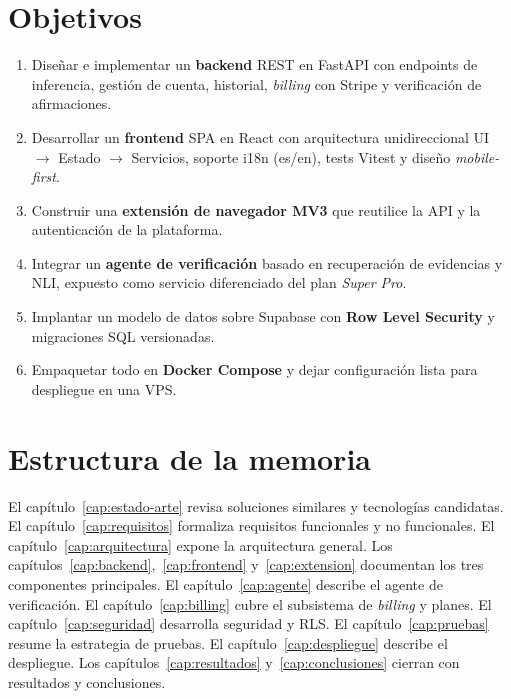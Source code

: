 \section{Objetivos}

\begin{enumerate}[leftmargin=*,itemsep=0.2em]
  \item Diseñar e implementar un \textbf{backend} REST en FastAPI con
        endpoints de inferencia, gestión de cuenta, historial,
        \emph{billing} con Stripe y verificación de afirmaciones.
  \item Desarrollar un \textbf{frontend} SPA en React con
        arquitectura unidireccional UI $\to$ Estado $\to$ Servicios,
        soporte i18n (es/en), tests Vitest y diseño \emph{mobile-first}.
  \item Construir una \textbf{extensión de navegador MV3} que reutilice
        la API y la autenticación de la plataforma.
  \item Integrar un \textbf{agente de verificación} basado en
        recuperación de evidencias y NLI, expuesto como servicio
        diferenciado del plan \emph{Super Pro}.
  \item Implantar un modelo de datos sobre Supabase con \textbf{Row
        Level Security} y migraciones SQL versionadas.
  \item Empaquetar todo en \textbf{Docker Compose} y dejar
        configuración lista para despliegue en una VPS.
\end{enumerate}

\section{Estructura de la memoria}

El capítulo~\ref{cap:estado-arte} revisa soluciones similares y
tecnologías candidatas. El capítulo~\ref{cap:requisitos} formaliza
requisitos funcionales y no funcionales. El capítulo~\ref{cap:arquitectura}
expone la arquitectura general. Los
capítulos~\ref{cap:backend},~\ref{cap:frontend} y~\ref{cap:extension}
documentan los tres componentes principales. El
capítulo~\ref{cap:agente} describe el agente de verificación. El
capítulo~\ref{cap:billing} cubre el subsistema de \emph{billing} y
planes. El capítulo~\ref{cap:seguridad} desarrolla seguridad y RLS.
El capítulo~\ref{cap:pruebas} resume la estrategia de pruebas. El
capítulo~\ref{cap:despliegue} describe el despliegue. Los
capítulos~\ref{cap:resultados} y~\ref{cap:conclusiones} cierran con
resultados y conclusiones.
